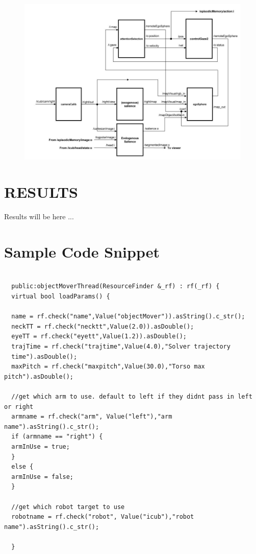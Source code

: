 \documentclass[a4paper, 11pt]{report}
\begin{document}
  \begin{figure}[h!]
    \centering
    \includegraphics[width=0.9\linewidth]{cognitive_architecture_A}
    \caption{}
    \label{fig:cognitive_architecture_A}
  \end{figure}  
  
\chapter{RESULTS}
  Results will be here ...
    
\appendix
\chapter{Sample Code Snippet}
  
  
  \begin{lstlisting}
  
  public:objectMoverThread(ResourceFinder &_rf) : rf(_rf) {
  virtual bool loadParams() {
  
  name = rf.check("name",Value("objectMover")).asString().c_str();
  neckTT = rf.check("necktt",Value(2.0)).asDouble();
  eyeTT = rf.check("eyett",Value(1.2)).asDouble();
  trajTime = rf.check("trajtime",Value(4.0),"Solver trajectory 
  time").asDouble();
  maxPitch = rf.check("maxpitch",Value(30.0),"Torso max pitch").asDouble();
  
  //get which arm to use. default to left if they didnt pass in left or right
  armname = rf.check("arm", Value("left"),"arm name").asString().c_str();
  if (armname == "right") {
  armInUse = true;
  }
  else {
  armInUse = false;
  }
  
  //get which robot target to use
  robotname = rf.check("robot", Value("icub"),"robot name").asString().c_str();
  
  }
\end{lstlisting}
\appendix
\end{document}

